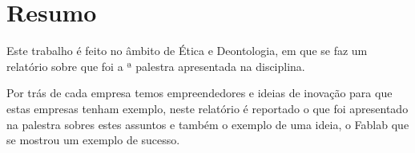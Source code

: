 \section{Resumo}
Este trabalho é feito no âmbito de Ética e Deontologia, em que se faz um relatório sobre \palestratitulo que foi a \palestranumero ª palestra apresentada na disciplina.

\myemptypage{}


Por trás de cada empresa temos empreendedores e ideias de inovação para que estas empresas tenham exemplo, neste relatório é reportado o que foi apresentado na palestra sobres estes assuntos e também o exemplo de uma ideia, o Fablab que se mostrou um exemplo de sucesso. 

